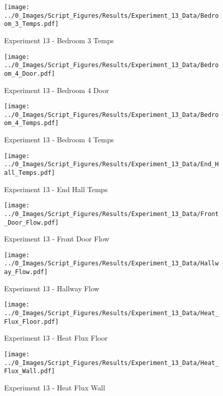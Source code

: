 	\begin{figure}[H]
		\centering
		\texttt{[image: ../0\_Images/Script\_Figures/Results/Experiment\_13\_Data/Bedroom\_3\_Temps.pdf]}
		\caption[]{Experiment 13 - Bedroom 3 Temps}
	\end{figure}
 
	\clearpage

	\begin{figure}[H]
		\centering
		\texttt{[image: ../0\_Images/Script\_Figures/Results/Experiment\_13\_Data/Bedroom\_4\_Door.pdf]}
		\caption[]{Experiment 13 - Bedroom 4 Door}
	\end{figure}
 

	\begin{figure}[H]
		\centering
		\texttt{[image: ../0\_Images/Script\_Figures/Results/Experiment\_13\_Data/Bedroom\_4\_Temps.pdf]}
		\caption[]{Experiment 13 - Bedroom 4 Temps}
	\end{figure}
 
	\clearpage

	\begin{figure}[H]
		\centering
		\texttt{[image: ../0\_Images/Script\_Figures/Results/Experiment\_13\_Data/End\_Hall\_Temps.pdf]}
		\caption[]{Experiment 13 - End Hall Temps}
	\end{figure}
 

	\begin{figure}[H]
		\centering
		\texttt{[image: ../0\_Images/Script\_Figures/Results/Experiment\_13\_Data/Front\_Door\_Flow.pdf]}
		\caption[]{Experiment 13 - Front Door Flow}
	\end{figure}
 
	\clearpage

	\begin{figure}[H]
		\centering
		\texttt{[image: ../0\_Images/Script\_Figures/Results/Experiment\_13\_Data/Hallway\_Flow.pdf]}
		\caption[]{Experiment 13 - Hallway Flow}
	\end{figure}
 

	\begin{figure}[H]
		\centering
		\texttt{[image: ../0\_Images/Script\_Figures/Results/Experiment\_13\_Data/Heat\_Flux\_Floor.pdf]}
		\caption[]{Experiment 13 - Heat Flux Floor}
	\end{figure}
 
	\clearpage

	\begin{figure}[H]
		\centering
		\texttt{[image: ../0\_Images/Script\_Figures/Results/Experiment\_13\_Data/Heat\_Flux\_Wall.pdf]}
		\caption[]{Experiment 13 - Heat Flux Wall}
	\end{figure}
 

